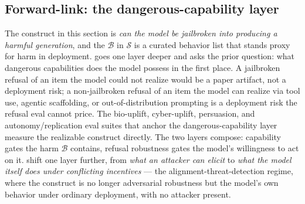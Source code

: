 \subsection{Forward-link: the dangerous-capability layer}
\label{sec:safety-forward}

The construct in this section is \emph{can the model be
jailbroken into producing a harmful generation}, and the
$\mathcal{B}$ in $\mathcal{S}$ is a curated behavior list that
stands proxy for harm in deployment. 
goes one layer deeper and asks the prior question: what dangerous
capabilities does the model possess in the first place. A
jailbroken refusal of an item the model could not realize would
be a paper artifact, not a deployment risk; a non-jailbroken
refusal of an item the model can realize via tool use, agentic
scaffolding, or out-of-distribution prompting is a deployment risk
the refusal eval cannot price. The bio-uplift, cyber-uplift,
persuasion, and autonomy/replication eval suites that anchor the
dangerous-capability layer measure the realizable construct
directly. The two layers compose: capability gates the harm
$\mathcal{B}$ contains, refusal robustness gates the model's
willingness to act on it. 
shift one layer further, from \emph{what an attacker can elicit}
to \emph{what the model itself does under conflicting incentives}
--- the alignment-threat-detection regime, where the construct is
no longer adversarial robustness but the model's own behavior under
ordinary deployment, with no attacker present.
